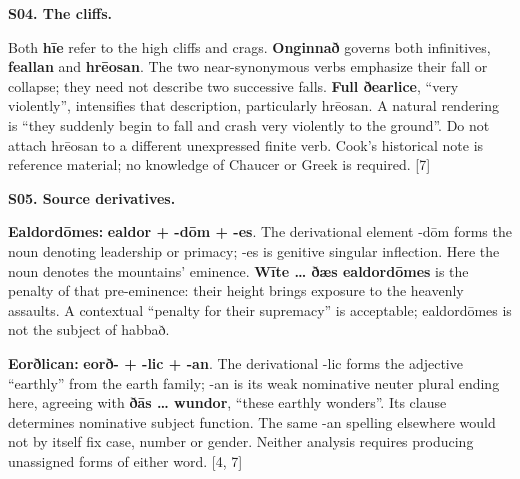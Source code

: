 \par\begin{minipage}{\linewidth}\raggedright
\textbf{S04. The cliffs.}

Both \textbf{hīe} refer to the high cliffs and crags. \textbf{Onginnað} governs both infinitives, \textbf{feallan} and \textbf{hrēosan}. The two near-synonymous verbs emphasize their fall or collapse; they need not describe two successive falls. \textbf{Full ðearlice}, “very violently”, intensifies that description, particularly hrēosan. A natural rendering is “they suddenly begin to fall and crash very violently to the ground”. Do not attach hrēosan to a different unexpressed finite verb. Cook's historical note is reference material; no knowledge of Chaucer or Greek is required. [7]

\end{minipage}\par\addvspace{4pt}

\par\begin{minipage}{\linewidth}\raggedright
\textbf{S05. Source derivatives.}

\textbf{Ealdordōmes:} \textbf{ealdor + -dōm + -es}. The derivational element -dōm forms the noun denoting leadership or primacy; -es is genitive singular inflection. Here the noun denotes the mountains' eminence. \textbf{Wīte … ðæs ealdordōmes} is the penalty of that pre-eminence: their height brings exposure to the heavenly assaults. A contextual “penalty for their supremacy” is acceptable; ealdordōmes is not the subject of habbað.

\textbf{Eorðlican:} \textbf{eorð- + -lic + -an}. The derivational -lic forms the adjective “earthly” from the earth family; -an is its weak nominative neuter plural ending here, agreeing with \textbf{ðās … wundor}, “these earthly wonders”. Its clause determines nominative subject function. The same -an spelling elsewhere would not by itself fix case, number or gender. Neither analysis requires producing unassigned forms of either word. [4, 7]

\end{minipage}\par\addvspace{4pt}

